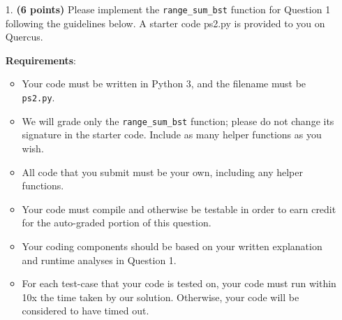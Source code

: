 \documentclass{assignment-263}
\begin{document}
\begin{enumerate}
\item[1.] \textbf{(6 points)}
Please implement the \verb|range_sum_bst| function for Question 1 following the guidelines below. 
A starter code ps2.py is provided to you on Quercus. 

\textbf{Requirements}:
\begin{itemize}
\item Your code must be written in Python 3, and the filename must be \verb|ps2.py|.
\item We will grade only the \verb|range_sum_bst| function;
      please do not change its signature in the starter code.
      Include as many helper functions as you wish.
\item All code that you submit must be your own, including any helper functions.
\item Your code must compile and otherwise be testable in order to earn credit
      for the auto-graded portion of this question.
\item Your coding components should be based on your written explanation and runtime analyses in Question 1.
\item For each test-case that your code is tested on, your code must run within
10x the time taken by our solution. Otherwise, your code will be considered to have timed out.
\end{itemize}


\end{enumerate}  
\end{document}
